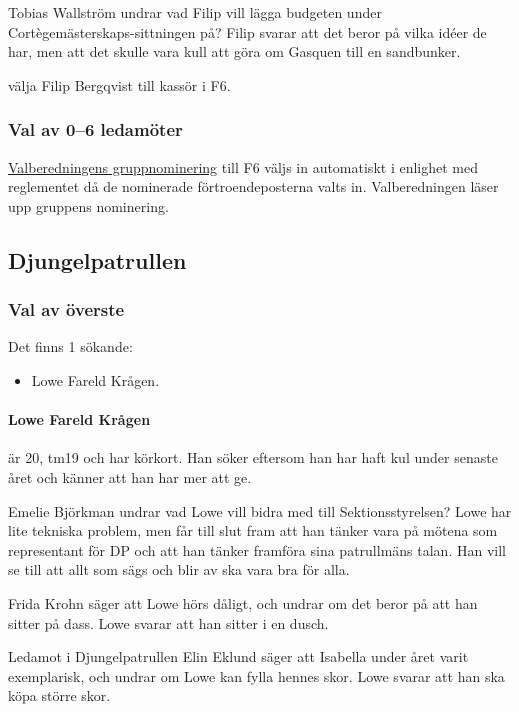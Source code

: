 \documentclass[hidelinks]{sektionsmote}
\begin{document}
Tobias Wallström undrar vad Filip vill lägga budgeten under Cortègemästerskaps-sittningen på?
Filip svarar att det beror på vilka idéer de har, men att det skulle vara kull att göra om Gasquen till en sandbunker.

\begin{beslut}
  \item välja Filip Bergqvist till kassör i F6.
\end{beslut}

\subsubsection{Val av 0--6 ledamöter}
\hyperlink{bilagor/nom/f6.pdf.1}{Valberedningens gruppnominering} till F6 väljs in automatiskt i enlighet med reglementet då de nominerade förtroendeposterna valts in.
Valberedningen läser upp gruppens nominering.

\subsection{Djungelpatrullen}

\subsubsection{Val av överste}
Det finns 1 sökande:
\begin{itemize}
    \item Lowe Fareld Krågen.
\end{itemize}

\paragraph{Lowe Fareld Krågen} är 20, tm19 och har körkort.
Han söker eftersom han har haft kul under senaste året och känner att han har mer att ge.

Emelie Björkman undrar vad Lowe vill bidra med till Sektionsstyrelsen?
Lowe har lite tekniska problem, men får till slut fram att han tänker vara på mötena som representant för DP och att han tänker framföra sina patrullmäns talan.
Han vill se till att allt som sägs och blir av ska vara bra för alla.

Frida Krohn säger att Lowe hörs dåligt, och undrar om det beror på att han sitter på dass.
Lowe svarar att han sitter i en dusch.

Ledamot i Djungelpatrullen Elin Eklund säger att Isabella under året varit exemplarisk, och undrar om Lowe kan fylla hennes skor.
Lowe svarar att han ska köpa större skor.
\end{document}
